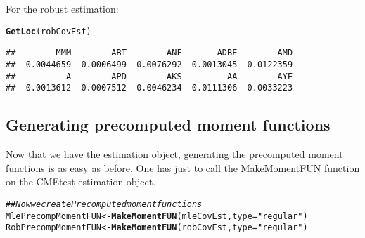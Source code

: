 \documentclass[12pt,letterpaper,english]{article}\usepackage[]{graphicx}\usepackage[]{color}
\makeatletter
\newcommand{\hlstr}[1]{\textcolor[rgb]{0.192,0.494,0.8}{#1}}%
\newcommand{\hlcom}[1]{\textcolor[rgb]{0.678,0.584,0.686}{\textit{#1}}}%
\newcommand{\hlstd}[1]{\textcolor[rgb]{0.345,0.345,0.345}{#1}}%
\newcommand{\hlkwb}[1]{\textcolor[rgb]{0.69,0.353,0.396}{#1}}%
\newcommand{\hlkwc}[1]{\textcolor[rgb]{0.333,0.667,0.333}{#1}}%
\newcommand{\hlkwd}[1]{\textcolor[rgb]{0.737,0.353,0.396}{\textbf{#1}}}%
\newenvironment{kframe}{%
 \def\at@end@of@kframe{}%
 \ifinner\ifhmode%
  \def\at@end@of@kframe{\end{minipage}}%
  \begin{minipage}{\columnwidth}%
 \fi\fi%
 \def\FrameCommand##1{\hskip\@totalleftmargin \hskip-\fboxsep
 \colorbox{shadecolor}{##1}\hskip-\fboxsep
     \hskip-\linewidth \hskip-\@totalleftmargin \hskip\columnwidth}%
 \MakeFramed {\advance\hsize-\width
   \@totalleftmargin\z@ \linewidth\hsize
   \@setminipage}}%
 {\par\unskip\endMakeFramed%
 \at@end@of@kframe}
\newenvironment{knitrout}{}{} %
\makeatother
\begin{document}
For the robust estimation:
\begin{knitrout}
\color{fgcolor}\begin{kframe}
\begin{alltt}
\hlkwd{GetLoc}\hlstd{(robCovEst)}
\end{alltt}
\begin{verbatim}
##        MMM        ABT        ANF       ADBE        AMD 
## -0.0044659  0.0006499 -0.0076292 -0.0013045 -0.0122359 
##          A        APD        AKS         AA        AYE 
## -0.0013612 -0.0007512 -0.0046234 -0.0111306 -0.0033223
\end{verbatim}
\end{kframe}
\end{knitrout}


\subsection{Generating precomputed moment functions}
Now that we have the estimation object, generating the precomputed moment functions is as easy as before. One has just to call the MakeMomentFUN function on the CMEtest estimation object.

\begin{knitrout}
\color{fgcolor}\begin{kframe}
\begin{alltt}
\hlcom{## Now we create Precomputed moment functions}
\hlstd{MlePrecompMomentFUN} \hlkwb{<-} \hlkwd{MakeMomentFUN}\hlstd{(mleCovEst,} \hlkwc{type} \hlstd{=} \hlstr{"regular"}\hlstd{)}
\hlstd{RobPrecompMomentFUN} \hlkwb{<-} \hlkwd{MakeMomentFUN}\hlstd{(robCovEst,} \hlkwc{type} \hlstd{=} \hlstr{"regular"}\hlstd{)}
\end{alltt}
\end{kframe}
\end{knitrout}
\end{document}
